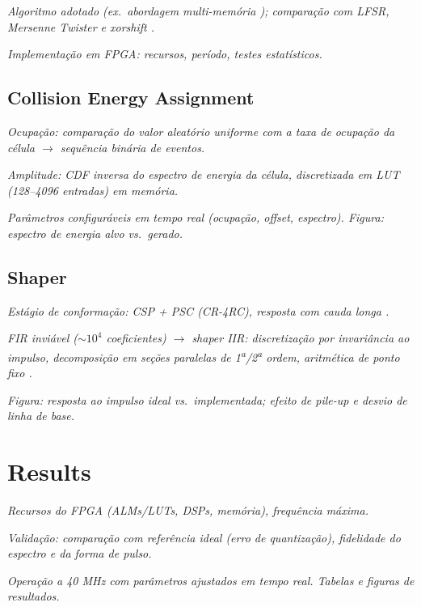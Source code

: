 \documentclass[journal]{IEEEtran}
\newcommand{\todo}[1]{\textcolor{red!70!black}{\textit{#1}}}
\begin{document}
\todo{Algoritmo adotado (ex.\ abordagem multi-memória \cite{paschoalin2026}); comparação com LFSR, Mersenne Twister e xorshift \cite{matsumoto1998,marsaglia2003,thomas2007,li2014}.}

\todo{Implementação em FPGA: recursos, período, testes estatísticos.}

\subsection{Collision Energy Assignment}

\todo{Ocupação: comparação do valor aleatório uniforme com a taxa de ocupação da célula $\rightarrow$ sequência binária de eventos.}

\todo{Amplitude: CDF inversa do espectro de energia da célula, discretizada em LUT (128--4096 entradas) em memória.}

\todo{Parâmetros configuráveis em tempo real (ocupação, offset, espectro). Figura: espectro de energia alvo vs.\ gerado.}

\subsection{Shaper}

\todo{Estágio de conformação: CSP + PSC (CR-4RC), resposta com cauda longa \cite{quirino2025}.}

\todo{FIR inviável ($\sim 10^4$ coeficientes) $\rightarrow$ shaper IIR: discretização por invariância ao impulso, decomposição em seções paralelas de 1\textsuperscript{a}/2\textsuperscript{a} ordem, aritmética de ponto fixo \cite{jordanov1994,regadio2014}.}

\todo{Figura: resposta ao impulso ideal vs.\ implementada; efeito de pile-up e desvio de linha de base.}

\section{Results}

\todo{Recursos do FPGA (ALMs/LUTs, DSPs, memória), frequência máxima.}

\todo{Validação: comparação com referência ideal (erro de quantização), fidelidade do espectro e da forma de pulso.}

\todo{Operação a 40 MHz com parâmetros ajustados em tempo real. Tabelas e figuras de resultados.}

\end{document}
